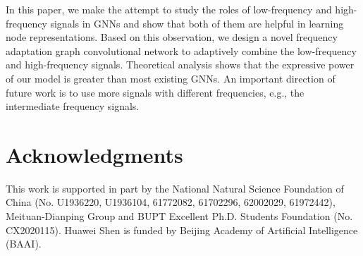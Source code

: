 \documentclass[letterpaper]{article} \usepackage{aaai21}  \usepackage{times}  \usepackage{helvet} \usepackage{courier}  \usepackage[hyphens]{url}  \usepackage{graphicx} \urlstyle{rm} \def\UrlFont{\rm}  \usepackage{natbib}  \usepackage{caption} \frenchspacing  \setlength{\pdfpagewidth}{8.5in}  \setlength{\pdfpageheight}{11in}
\begin{document}
In this paper, we make the attempt to study the roles of low-frequency and high-frequency signals in GNNs and show that both of them are helpful in learning node representations. Based on this observation, we design a novel frequency adaptation graph convolutional network to adaptively combine the low-frequency and high-frequency signals. Theoretical analysis shows that the expressive power of our model is greater than most existing GNNs.
An important direction of future work is to use more signals with different frequencies, e.g., the intermediate frequency signals.

\section{Acknowledgments}
This work is supported in part by the National Natural Science Foundation of China (No. U1936220, U1936104, 61772082, 61702296, 62002029, 61972442), Meituan-Dianping Group and BUPT Excellent Ph.D. Students Foundation (No. CX2020115). Huawei Shen is funded by Beijing Academy of Artificial Intelligence (BAAI).



\end{document}
